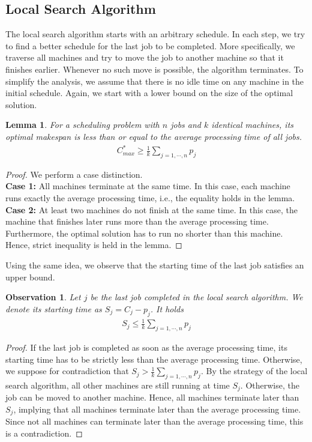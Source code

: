 \documentclass[11pt,psfig,times]{article}
\newtheorem{lemma}[theorem]{Lemma}
\newtheorem{observation}[theorem]{Observation}
\begin{document}
\subsection{Local Search Algorithm}
The local search algorithm starts with an arbitrary schedule. In each step, we try to find a better schedule for the last job to be completed. 
More specifically, we traverse all machines and try to move the job to another machine so that it finishes earlier. 
Whenever no such move is possible, the algorithm terminates. To simplify the analysis, we assume that there is no idle time on any machine in the initial schedule.  
Again, we start with a lower bound on the size of the optimal solution. 
\begin{lemma}
    \label{lemma:lowerbound2}
    For a scheduling problem with $n$ jobs and $k$ identical machines, its optimal makespan is less than or equal to the average processing time of all jobs.
    \begin{align*}
        C_{max}^* \geq \frac{1}{k} \sum_{j=1, \cdots, n} p_j
    \end{align*} 
\end{lemma}
\begin{proof}
    We perform a case distinction.\\
        \textbf{Case 1:} All machines terminate at the same time. In this case, each machine runs exactly the average processing time, i.e., the equality holds in the lemma. \\
        \textbf{Case 2:} At least two machines do not finish at the same time. In this case, the machine that finishes later runs more than the average processing time. Furthermore, the optimal solution has to run no shorter than this machine. \\
        Hence, strict inequality is held in the lemma.
\end{proof}
Using the same idea, we observe that the starting time of the last job satisfies an upper bound. 
\begin{observation}
    \label{observation:upperbound}
    Let $j$ be the last job completed in the local search algorithm. We denote its starting time as $S_j = C_j - p_j$. It holds 
    \begin{align*}
        S_j \leq \frac{1}{k} \sum_{j=1, \cdots, n} p_j
    \end{align*}
\end{observation}
\begin{proof}
   If the last job is completed as soon as the average processing time, its starting time has to be strictly less than the average processing time. 
    Otherwise, we suppose for contradiction that $S_j > \frac{1}{k} \sum_{j=1, \cdots, n} p_j$. By the strategy of the local search algorithm,
    all other machines are still running at time $S_j$. Otherwise, the job can be moved to another machine. Hence, all machines terminate 
    later than $S_j$, implying that all machines terminate later than the average processing time. Since not all machines can terminate later than 
    the average processing time, this is a contradiction. 
\end{proof}
\end{document}
